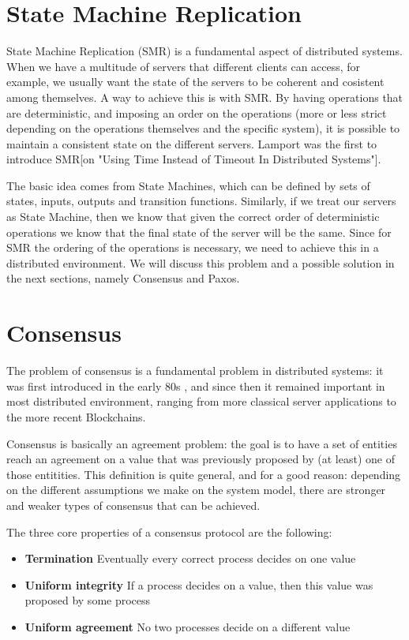 \section{State Machine Replication}\label{sec:state-machine-replication}
State Machine Replication (SMR) is a fundamental aspect of distributed systems. When we have a multitude of servers that different clients can access, for example, we usually want the state of the servers to be coherent and cosistent among themselves. A way to achieve this is with SMR. By having operations that are deterministic, and imposing an order on the operations (more or less strict depending on the operations themselves and the specific system), it is possible to maintain a consistent state on the different servers. Lamport was the first to introduce SMR[on "Using Time Instead of Timeout In Distributed Systems"].

The basic idea comes from State Machines, which can be defined by sets of states, inputs, outputs and transition functions. Similarly, if we treat our servers as State Machine, then we know that given the correct order of deterministic operations we know that the final state of the server will be the same. Since for SMR the ordering of the operations is necessary, we need to achieve this in a distributed environment. We will discuss this problem and a possible solution in the next sections, namely Consensus and Paxos.

\section{Consensus}\label{sec:Consensus}

The problem of consensus is a fundamental problem in distributed systems: it was first introduced in the early 80s \cite[]{Pease}, \cite[]{Lamport} and since then it remained important in most distributed environment, ranging from more classical server applications to the more recent Blockchains.

Consensus is basically an agreement problem: the goal is to have a set of entities reach an agreement on a value that was previously proposed by (at least) one of those entitities. This definition is quite general, and for a good reason: depending on the different assumptions we make on the system model, there are stronger and weaker types of consensus that can be achieved. 

The three core properties of a consensus protocol are the following:

\begin{itemize}
    \item \textbf{Termination} Eventually every correct process decides on one value
    \item \textbf{Uniform integrity} If a process decides on a value, then this value was proposed by some process
    \item \textbf{Uniform agreement} No two processes decide on a different value
    \end{itemize}

